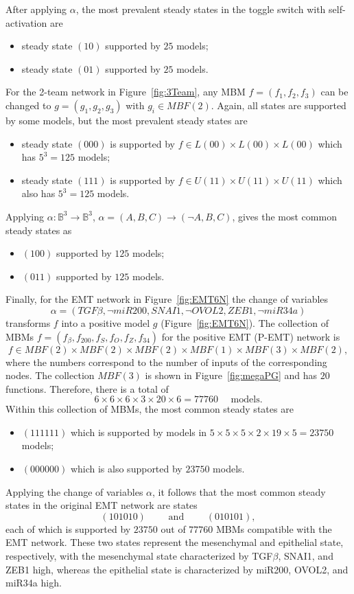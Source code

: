\documentclass[10pt,letterpaper]{article}
\newcommand{\bbB}{\mathbb{B}}
\begin{document}
After applying $\alpha$, the most prevalent steady states in the toggle switch with self-activation are
\begin{itemize}
\item steady state $(10)$ supported by $25$ models;
\item steady state $(01)$ supported by $25$ models.
\end{itemize}


For the 2-team network in Figure~\ref{fig:3Team}, any MBM $f=(f_1, f_2, f_3)$ can be changed to $g=(g_1, g_2, g_3)$ with $g_i \in MBF(2)$. Again, all states are supported by some models, but the most prevalent steady states are 
\begin{itemize}
\item steady state $(000)$ is supported by $f \in L(00)\times L(00)\times L(00)$ which has $5^3=125$ models;
\item steady state $(111)$ is supported by $f \in U(11)\times U(11)\times U(11)$ which also has $5^3=125$ models.
\end{itemize}
Applying $\alpha:\bbB^3\to \bbB^3$, $\alpha= (A,B,C) \to (\neg A, B, C)$, gives the most common steady states as 
\begin{itemize}
\item $(100)$ supported by $125$ models;
\item $(011)$ supported by $125$ models.
\end{itemize}

Finally, for the EMT network in Figure~\ref{fig:EMT6N} the change of variables \[\alpha = (TGF\beta, \neg miR200, SNAI1, \neg OVOL2, ZEB1, \neg miR34a) \] transforms $f$ into a positive model $g$ (Figure~\ref{fig:EMT6N}).
The collection of MBMs $f=(f_\beta,f_{200},f_S,f_O,f_Z,f_{34})$ for the positive EMT  (P-EMT) network
is 
\[ f \in MBF(2) \times MBF(2) \times MBF(2) \times MBF(1) \times MBF(3) \times MBF(2),\]
where the numbers correspond to the number of inputs of the corresponding nodes. The collection $MBF(3)$ is shown in Figure~\ref{fig:megaPG} and has $20$ functions.
Therefore, there is a total of 
\[ 6\times 6 \times 6 \times 3 \times 20 \times 6=77760 \quad \mbox{ models.}\]
Within this collection of MBMs, the most common steady states are 
\begin{itemize}
\item $(111111)$ which is supported by models in $5\times 5\times 5 \times 2 \times 19 \times 5= 23750$ models;
\item $(000000)$ which is also supported by $23750$ models.
\end{itemize}
Applying the change of variables $\alpha$, it follows that the most common steady states in the original EMT network are 
states 
\[ (101010) \qquad \mbox{ and } \qquad (010101),\]
each of which is supported by $23750$ out of $77760$ MBMs compatible with the EMT network. These two states represent the mesenchymal and epithelial state, respectively, with the mesenchymal state characterized by TGF$\beta$, SNAI1, and ZEB1 high, whereas the epithelial state is characterized by miR200, OVOL2, and miR34a high.
\end{document}
